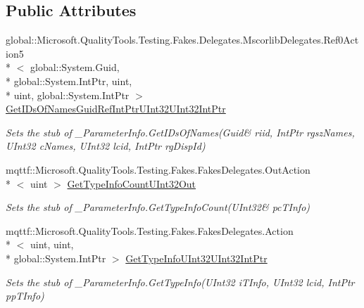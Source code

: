 \subsection*{Public Attributes}
\begin{DoxyCompactItemize}
\item 
global\-::\-Microsoft.\-Quality\-Tools.\-Testing.\-Fakes.\-Delegates.\-Mscorlib\-Delegates.\-Ref0\-Action5\\*
$<$ global\-::\-System.\-Guid, \\*
global\-::\-System.\-Int\-Ptr, uint, \\*
uint, global\-::\-System.\-Int\-Ptr $>$ \hyperlink{class_system_1_1_runtime_1_1_interop_services_1_1_fakes_1_1_stub___parameter_info_a6796293bafe36d4618504d978fd44e55}{Get\-I\-Ds\-Of\-Names\-Guid\-Ref\-Int\-Ptr\-U\-Int32\-U\-Int32\-Int\-Ptr}
\begin{DoxyCompactList}\small\item\em Sets the stub of \-\_\-\-Parameter\-Info.\-Get\-I\-Ds\-Of\-Names(Guid\& riid, Int\-Ptr rgsz\-Names, U\-Int32 c\-Names, U\-Int32 lcid, Int\-Ptr rg\-Disp\-Id)\end{DoxyCompactList}\item 
mqttf\-::\-Microsoft.\-Quality\-Tools.\-Testing.\-Fakes.\-Fakes\-Delegates.\-Out\-Action\\*
$<$ uint $>$ \hyperlink{class_system_1_1_runtime_1_1_interop_services_1_1_fakes_1_1_stub___parameter_info_aa840f208ceac95782a886788860a3b81}{Get\-Type\-Info\-Count\-U\-Int32\-Out}
\begin{DoxyCompactList}\small\item\em Sets the stub of \-\_\-\-Parameter\-Info.\-Get\-Type\-Info\-Count(U\-Int32\& pc\-T\-Info)\end{DoxyCompactList}\item 
mqttf\-::\-Microsoft.\-Quality\-Tools.\-Testing.\-Fakes.\-Fakes\-Delegates.\-Action\\*
$<$ uint, uint, \\*
global\-::\-System.\-Int\-Ptr $>$ \hyperlink{class_system_1_1_runtime_1_1_interop_services_1_1_fakes_1_1_stub___parameter_info_aed59b23da904068c9472f5dfb57c4a31}{Get\-Type\-Info\-U\-Int32\-U\-Int32\-Int\-Ptr}
\begin{DoxyCompactList}\small\item\em Sets the stub of \-\_\-\-Parameter\-Info.\-Get\-Type\-Info(\-U\-Int32 i\-T\-Info, U\-Int32 lcid, Int\-Ptr pp\-T\-Info)\end{DoxyCompactList}\item 

\end{DoxyCompactItemize}
